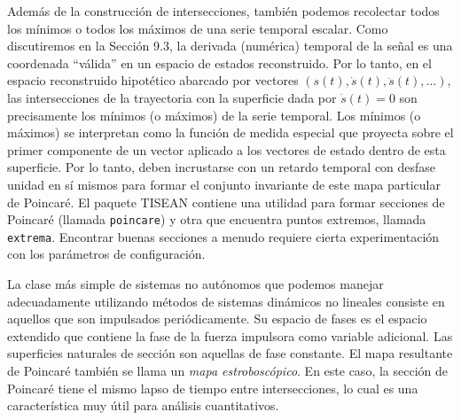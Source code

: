\documentclass[10pt,a4paper]{book}
\begin{document}
Además de la construcción de intersecciones, también podemos recolectar todos los mínimos o todos los máximos de una serie temporal escalar. Como discutiremos en la Sección 9.3, la derivada (numérica) temporal de la señal es una coordenada “válida” en un espacio de estados reconstruido. Por lo tanto, en el espacio reconstruido hipotético abarcado por vectores $(s(t), \dot{s}(t), \ddot{s}(t), \ldots)$, las intersecciones de la trayectoria con la superficie dada por $\dot{s}(t) = 0$ son precisamente los mínimos (o máximos) de la serie temporal. Los mínimos (o máximos) se interpretan como la función de medida especial que proyecta sobre el primer componente de un vector aplicado a los vectores de estado dentro de esta superficie. Por lo tanto, deben incrustarse con un retardo temporal con desfase unidad en sí mismos para formar el conjunto invariante de este mapa particular de Poincaré. El paquete TISEAN contiene una utilidad para formar secciones de Poincaré (llamada \texttt{poincare}) y otra que encuentra puntos extremos, llamada \texttt{extrema}. Encontrar buenas secciones a menudo requiere cierta experimentación con los parámetros de configuración.

La clase más simple de sistemas no autónomos que podemos manejar adecuadamente utilizando métodos de sistemas dinámicos no lineales consiste en aquellos que son impulsados periódicamente. Su espacio de fases es el espacio extendido que contiene la fase de la fuerza impulsora como variable adicional. Las superficies naturales de sección son aquellas de fase constante. El mapa resultante de Poincaré también se llama un \textit{mapa estroboscópico}. En este caso, la sección de Poincaré tiene el mismo lapso de tiempo entre intersecciones, lo cual es una característica muy útil para análisis cuantitativos.

\newpage
\end{document}
